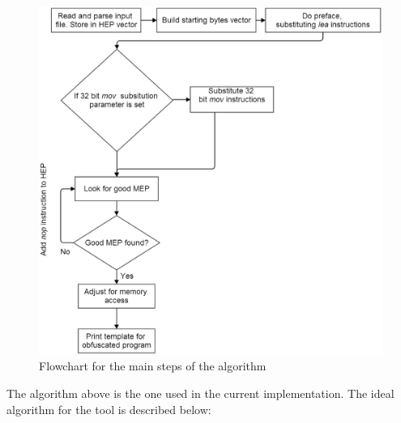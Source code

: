 \documentclass[11pt,twoside]{eitExjobb}
\begin{document}
\begin{figure}[here]
\includegraphics[scale=0.32]{flowchart.eps}
\caption{Flowchart for the main steps of the algorithm}
\label{fig:mainsteps}
\end{figure}

\noindent The algorithm above is the one used in the current implementation. The ideal algorithm for the tool is described below:
\end{document}
